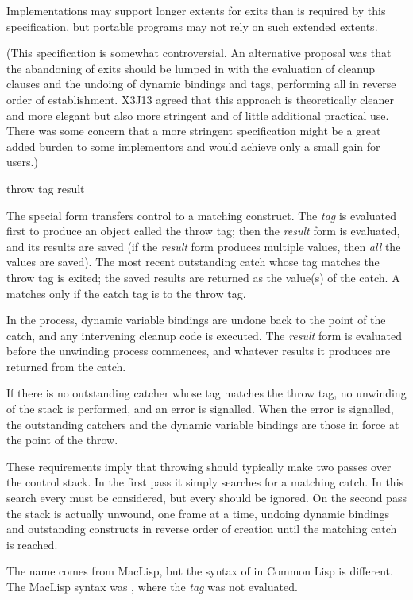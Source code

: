 \begin{defspec}
\begin{newer}
Implementations may support longer extents for exits than is
required by this specification,
but portable programs may not rely on such extended extents.

(This specification is somewhat controversial.  An alternative proposal was
that the abandoning of exits should be lumped in with
the evaluation of  cleanup clauses and the
undoing of dynamic bindings and  tags, performing all
in reverse order of establishment.  X3J13 agreed that this approach is
theoretically cleaner and more elegant but also more stringent
and of little additional practical use.  There was some concern that
a more stringent specification might be a great added burden to some
implementors and would achieve only a small gain for users.)
\end{newer}
\end{defspec}

\begin{defspec}
throw tag result

The  special form transfers control to a matching
 construct.
The \textit{tag} is evaluated first to produce an object
called the throw tag; then the \textit{result} form is evaluated,
and its results are saved (if the \textit{result} form produces
multiple values, then \textit{all} the values are saved).
The most recent outstanding catch whose tag matches the throw tag
is exited; the saved results are returned as the value(s) of the catch.
A  matches only if the catch tag is  to the throw tag.

In the process, dynamic variable
bindings are undone back to the point of the catch, and any intervening
 cleanup code is executed.
The \textit{result} form is evaluated before the unwinding process commences,
and whatever results it produces are returned from the catch.

If there is no outstanding catcher whose tag matches the throw tag,
no unwinding of the stack is performed, and an error is signalled.
When the error is signalled, the outstanding catchers and the dynamic
variable bindings are those in force at the point of the throw.

\beforenoterule
\begin{implementation}
These requirements imply that throwing should typically
make two passes over the control stack.  In the first pass it simply
searches for a matching catch.  In this search every 
must be considered, but every
 should be ignored.  On the second pass the stack
is actually unwound, one frame at a time, undoing dynamic bindings
and outstanding  constructs in reverse order of creation
until the matching catch is reached.
\end{implementation}
\betweennoterule
\begin{incompatibility}
The name  comes from MacLisp,
but the syntax of  in Common Lisp is different.
The MacLisp syntax was ,
where the \textit{tag} was not evaluated.
\end{incompatibility}
\afternoterule
\end{defspec}
